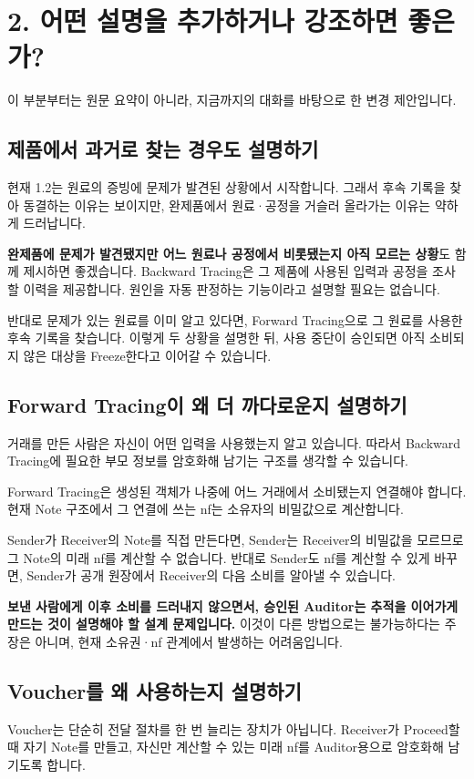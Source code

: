 \section*{2. 어떤 설명을 추가하거나 강조하면 좋은가?}
\enlargethispage{2\baselineskip}
이 부분부터는 원문 요약이 아니라, 지금까지의 대화를 바탕으로 한 변경 제안입니다.

\subsection*{제품에서 과거로 찾는 경우도 설명하기}
현재 1.2는 원료의 증빙에 문제가 발견된 상황에서 시작합니다.
그래서 후속 기록을 찾아 동결하는 이유는 보이지만, 완제품에서 원료·공정을 거슬러 올라가는 이유는 약하게 드러납니다.

\textbf{완제품에 문제가 발견됐지만 어느 원료나 공정에서 비롯됐는지 아직 모르는 상황}도 함께 제시하면 좋겠습니다.
Backward Tracing은 그 제품에 사용된 입력과 공정을 조사할 이력을 제공합니다.
원인을 자동 판정하는 기능이라고 설명할 필요는 없습니다.

반대로 문제가 있는 원료를 이미 알고 있다면, Forward Tracing으로 그 원료를 사용한 후속 기록을 찾습니다.
이렇게 두 상황을 설명한 뒤, 사용 중단이 승인되면 아직 소비되지 않은 대상을 Freeze한다고 이어갈 수 있습니다.

\subsection*{Forward Tracing이 왜 더 까다로운지 설명하기}
거래를 만든 사람은 자신이 어떤 입력을 사용했는지 알고 있습니다.
따라서 Backward Tracing에 필요한 부모 정보를 암호화해 남기는 구조를 생각할 수 있습니다.

Forward Tracing은 생성된 객체가 나중에 어느 거래에서 소비됐는지 연결해야 합니다.
현재 Note 구조에서 그 연결에 쓰는 nf는 소유자의 비밀값으로 계산합니다.

Sender가 Receiver의 Note를 직접 만든다면, Sender는 Receiver의 비밀값을 모르므로 그 Note의 미래 nf를 계산할 수 없습니다.
반대로 Sender도 nf를 계산할 수 있게 바꾸면, Sender가 공개 원장에서 Receiver의 다음 소비를 알아낼 수 있습니다.

\textbf{보낸 사람에게 이후 소비를 드러내지 않으면서, 승인된 Auditor는 추적을 이어가게 만드는 것이 설명해야 할 설계 문제입니다.}
이것이 다른 방법으로는 불가능하다는 주장은 아니며, 현재 소유권·nf 관계에서 발생하는 어려움입니다.

\subsection*{Voucher를 왜 사용하는지 설명하기}
Voucher는 단순히 전달 절차를 한 번 늘리는 장치가 아닙니다.
Receiver가 Proceed할 때 자기 Note를 만들고, 자신만 계산할 수 있는 미래 nf를 Auditor용으로 암호화해 남기도록 합니다.

